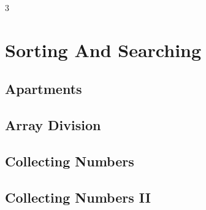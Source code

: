 \documentclass[8pt]{extarticle}
\begin{document}
\pagebreak
\begin{multicols*}{3}

\section{Sorting And Searching}

\subsection{Apartments}
\begin{caixaenunciado}

\end{caixaenunciado}
\vspace{0.3cm}


\subsection{Array Division}
\begin{caixaenunciado}

\end{caixaenunciado}
\vspace{0.3cm}


\subsection{Collecting Numbers}
\begin{caixaenunciado}

\end{caixaenunciado}
\vspace{0.3cm}


\subsection{Collecting Numbers II}
\begin{caixaenunciado}

\end{caixaenunciado}
\vspace{0.3cm}



\end{multicols*}
\end{document}

